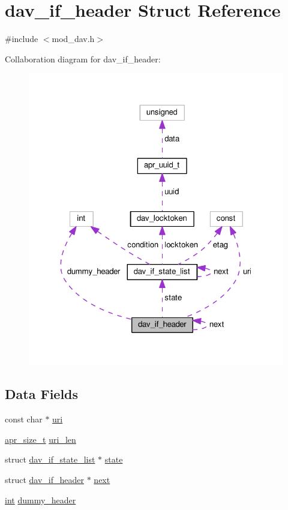 \hypertarget{structdav__if__header}{}\section{dav\+\_\+if\+\_\+header Struct Reference}
\label{structdav__if__header}


{\ttfamily \#include $<$mod\+\_\+dav.\+h$>$}



Collaboration diagram for dav\+\_\+if\+\_\+header\+:
\nopagebreak
\begin{figure}[H]
\begin{center}
\leavevmode
\includegraphics[width=321pt]{structdav__if__header__coll__graph}
\end{center}
\end{figure}
\subsection*{Data Fields}
\begin{DoxyCompactItemize}
\item 
const char $\ast$ \hyperlink{structdav__if__header_a39fd578ebb057f1790391b4b6046a829}{uri}
\item 
\hyperlink{group__apr__platform_gaaa72b2253f6f3032cefea5712a27540e}{apr\+\_\+size\+\_\+t} \hyperlink{structdav__if__header_a2001281285ca779d35e1c880dc7ead20}{uri\+\_\+len}
\item 
struct \hyperlink{structdav__if__state__list}{dav\+\_\+if\+\_\+state\+\_\+list} $\ast$ \hyperlink{structdav__if__header_a207b17a4d7ca0ac1140041d503adcdad}{state}
\item 
struct \hyperlink{structdav__if__header}{dav\+\_\+if\+\_\+header} $\ast$ \hyperlink{structdav__if__header_a8692a3d4d3ba871236222dc47db84480}{next}
\item 
\hyperlink{pcre_8txt_a42dfa4ff673c82d8efe7144098fbc198}{int} \hyperlink{structdav__if__header_af664db521e06b3271803b9dc447e73c3}{dummy\+\_\+header}
\end{DoxyCompactItemize}


